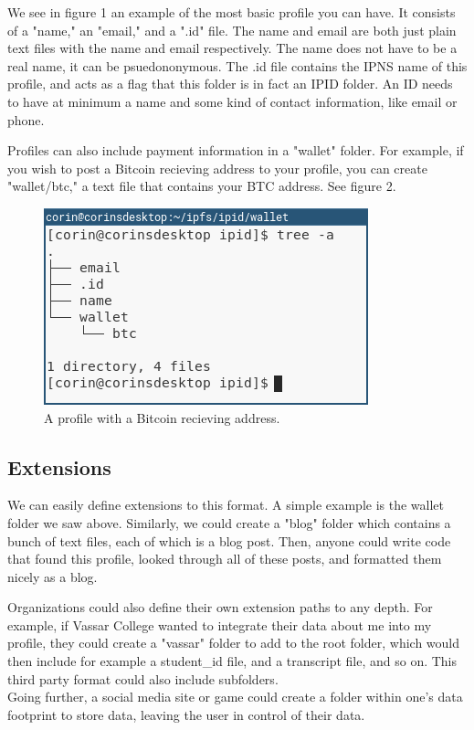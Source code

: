 \documentclass{article}
\begin{document}
We see in figure 1 an example of the most basic profile you can have. It consists of a "name," an "email," and a ".id" file. The name and email are both just plain text files with the name and email respectively. The name does not have to be a real name, it can be psuedononymous. The .id file contains the IPNS name of this profile, and acts as a flag that this folder is in fact an IPID folder. An ID needs to have at minimum a name and some kind of contact information, like email or phone. \par
Profiles can also include payment information in a "wallet" folder. For example, if you wish to post a Bitcoin recieving address to your profile, you can create "wallet/btc," a text file that contains your BTC address. See figure 2.

\begin{figure}[h]
  \centering
  \includegraphics[width=.5\textwidth]{resources/basic_profile_wallet.png}
  \caption{A profile with a Bitcoin recieving address.}
\end{figure}

\subsection{Extensions}

We can easily define extensions to this format. A simple example is the wallet folder we saw above. Similarly, we could create a "blog" folder which contains a bunch of text files, each of which is a blog post. Then, anyone could write code that found this profile, looked through all of these posts, and formatted them nicely as a blog. \par
Organizations could also define their own extension paths to any depth. For example, if Vassar College wanted to integrate their data about me into my profile, they could create a "vassar" folder to add to the root folder, which would then include for example a student\_id file, and a transcript file, and so on. This third party format could also include subfolders. \\
Going further, a social media site or game could create a folder within one's data footprint to store data, leaving the user in control of their data. 
\end{document}
